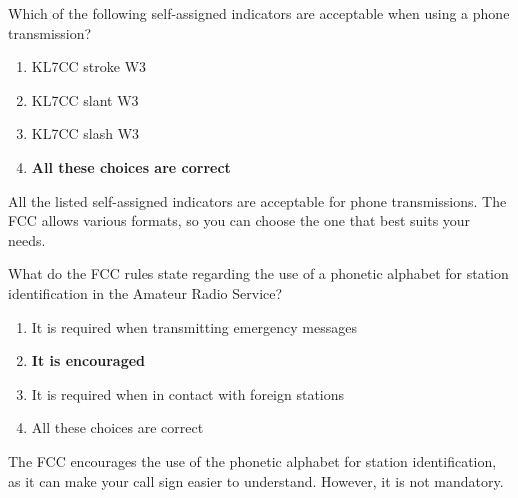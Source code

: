 \begin{tcolorbox}[colback=gray!10!white,colframe=black!75!black,title={T1F06}]
    Which of the following self-assigned indicators are acceptable when using a phone transmission?
    \begin{enumerate}[label=\Alph*),noitemsep]
        \item KL7CC stroke W3
        \item KL7CC slant W3
        \item KL7CC slash W3
        \item \textbf{All these choices are correct}
    \end{enumerate}
\end{tcolorbox}
All the listed self-assigned indicators are acceptable for phone transmissions. The FCC allows various formats, so you can choose the one that best suits your needs.

\begin{tcolorbox}[colback=gray!10!white,colframe=black!75!black,title={T1A03}]
    What do the FCC rules state regarding the use of a phonetic alphabet for station identification in the Amateur Radio Service?
    \begin{enumerate}[label=\Alph*),noitemsep]
        \item It is required when transmitting emergency messages
        \item \textbf{It is encouraged}
        \item It is required when in contact with foreign stations
        \item All these choices are correct
    \end{enumerate}
\end{tcolorbox}
The FCC encourages the use of the phonetic alphabet for station identification, as it can make your call sign easier to understand. However, it is not mandatory.
